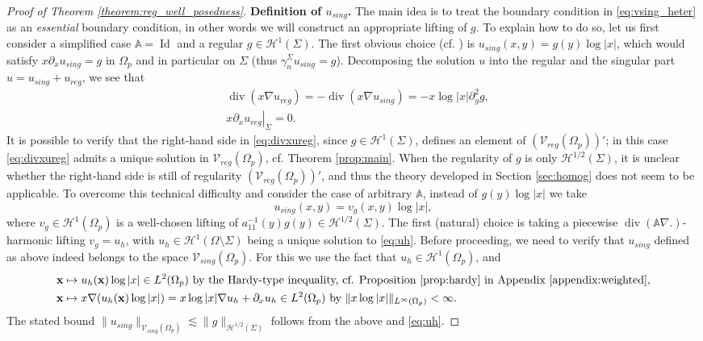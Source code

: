 \documentclass[report]{elsarticle}
\numberwithin{theorem}{section}
\renewcommand{\vec}[1]{\mathbf{#1}}
\begin{document}
\begin{proof}[Proof of Theorem \ref{theorem:reg_well_posedness}]
	\textbf{Definition of $u_{sing}$. }
	The main idea is to treat the boundary condition in \eqref{eq:vsing_heter} as an \textit{essential} boundary condition, in other words we will construct an appropriate lifting of $g$. To explain how to do so, let us first consider a simplified case $\mathbb{A}=\operatorname{Id}$ and a regular $g\in \mathcal{H}^1(\Sigma)$. The first obvious choice (cf. \cite{nicolopoulos}) is $u_{sing}(x,y)=g(y)\log|x|$, which would satisfy $x\partial_xu_{sing}=g$ in $\Omega_p$ and in particular on $\Sigma$ (thus $\gamma_{n}^{\Sigma}u_{sing}=g$). Decomposing the solution $u$ into the regular and the singular part $u=u_{sing}+u_{reg}$, we see that 
	\begin{align}
		\label{eq:divxureg}
		&\operatorname{div}(x\nabla u_{reg})=-\operatorname{div}(x\nabla u_{sing})=-x\log|x|\partial_y^2 g,\\
		\nonumber
		&\left.x\partial_x u_{reg}\right|_{\Sigma}=0.
	\end{align}
	It is possible to verify that the right-hand side in \eqref{eq:divxureg}, since $g\in \mathcal{H}^{1}(\Sigma)$, defines an element of $\left(\mathcal{V}_{reg}(\Omega_p)\right)'$; in this case \eqref{eq:divxureg} admits a unique solution in $\mathcal{V}_{reg}(\Omega_p)$, cf. Theorem \ref{prop:main}. When the regularity of $g$ is only $\mathcal{H}^{1/2}(\Sigma)$, it is unclear whether the right-hand side is still of regularity $\left(\mathcal{V}_{reg}(\Omega_p)\right)'$, and thus the theory developed in Section \ref{sec:homog} does not seem to be applicable. 
	To overcome this technical difficulty and consider the case of arbitrary $ \mathbb{A}$, instead of $g(y)\log|x|$ we take $$u_{sing}(x,y)=v_{g} (x,y)\log|x|,$$ where $v_{g}\in \mathcal{H}^1(\Omega_p)$ is a well-chosen lifting of $a_{11}^{-1}(y)g(y)\in \mathcal{H}^{1/2}(\Sigma)$. The first (natural) choice is taking a piecewise  $\operatorname{div}(\mathbb{A}\nabla.)$-harmonic lifting $v_{g}=u_h$, with $u_h\in \mathcal{H}^1(\Omega\setminus\Sigma)$ being a unique solution to \eqref{eq:uh}. Before proceeding, we need to verify that  $u_{sing}$ defined as above indeed belongs to the space $\mathcal{V}_{sing}(\Omega_p)$. For this we use the fact that $u_h\in \mathcal{H}^1(\Omega_p)$, and   
	\begin{align*}
		&\vec{x}\mapsto u_h(\vec{x})\log|x| \in L^2(\Omega_p) \text{ by the Hardy-type  inequality, cf. Proposition \ref{prop:hardy} in Appendix  \ref{appendix:weighted}},\\	
		&\vec{x}\mapsto x\nabla (u_h(\vec{x})\log|x|)=x\log|x|\nabla u_h+\partial_x u_h \in L^2(\Omega_p) \text{ by $\|x\log|x|\|_{L^{\infty}(\Omega_p)}<\infty$.}
	\end{align*}
	The stated bound $\|u_{sing}\|_{\mathcal{V}_{sing}(\Omega_p)}\lesssim \|g\|_{\mathcal{H}^{1/2}(\Sigma)}$ follows from the above and \eqref{eq:uh}.
	

\end{proof}
\end{document}
